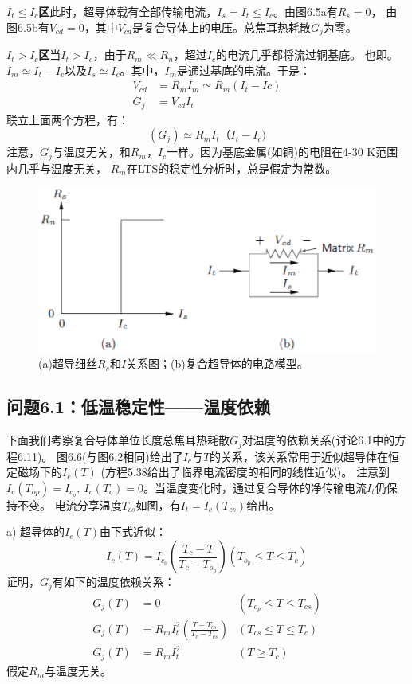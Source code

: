 \textbf{$I_t\le I_c$区}\quad 此时，超导体载有全部传输电流，$I_s=I_t\le I_c$。由图6.5a有$R_s=0$，
由图6.5b有$V_{cd}=0$，其中$V_{cd}$是复合导体上的电压。总焦耳热耗散$G_j$为零。

\textbf{$I_t>I_c$区}\quad 当$I_t>I_c$，由于$R_m\ll R_n$，超过$I_c$的电流几乎都将流过铜基底。
也即。$I_m\simeq I_t-I_c$以及$I_s\simeq I_c$。其中，$I_m$是通过基底的电流。于是：
\begin{subequations}
	\begin{align}
	V_{cd}&=R_mI_m\simeq R_m{(I_t-Ic)}\\
	G_{j}&=V_{cd}I_t
	\end{align}
\end{subequations}
联立上面两个方程，有：
\begin{equation}%
{(G_j)}\simeq R_{m}I_{t}{（I_t-I_c)}
\end{equation}
注意，$G_j$与温度无关，和$R_m，I_c$一样。因为基底金属(如铜)的电阻在4-30 K范围内几乎与温度无关，
$R_m$在LTS的稳定性分析时，总是假定为常数。
\begin{figure}[htbp]
	\centering
	\includegraphics[scale=0.7]{chpt6/figs/fig6.5.eps}
	\caption{(a)超导细丝$R_s$和$I$关系图；(b)复合超导体的电路模型。}
\end{figure}

\subsection{问题6.1：低温稳定性——温度依赖}
下面我们考察复合导体单位长度总焦耳热耗散$G_j$对温度的依赖关系(讨论6.1中的方程6.11)。
图6.6(与图6.2相同)给出了$I_c$与$T$的关系，该关系常用于近似超导体在恒定磁场下的$I_c(T)$
(方程5.38给出了临界电流密度的相同的线性近似)。
注意到$I_c(T_{op})=I_{c_o},\ I_c(T_c)=0$。当温度变化时，通过复合导体的净传输电流$I_t$仍保持不变。
电流分享温度$T_{cs}$如图，有$I_t=I_c(T_{cs})$给出。

a) 超导体的$I_c(T)$由下式近似：
\begin{equation}%
I_c(T)=I_{c_o}(\frac{T_c-T}{T_c-T_{o_p}}) (T_{o_p}\leq T \leq T_c)
\end{equation}
证明，$G_j$有如下的温度依赖关系：
\begin{subequations}
	\begin{align}
	G_j(T)&=0 &(T_{o_p}\leq T \leq T_{cs})\\
	G_j(T)&=R_mI_t^2(\frac{T-T_{cs}}{T_c-T_{cs}})&(T_{cs}\leq T\leq T_c)\\
	G_j(T)&=R_mI_t^2 &(T\ge T_c)
	\end{align}
\end{subequations}
假定$R_m$与温度无关。

